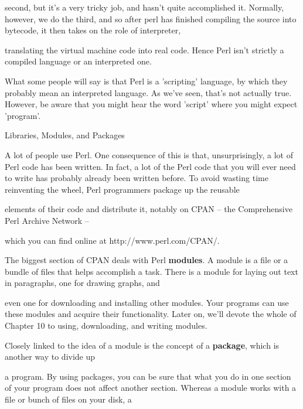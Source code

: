 \documentclass[a4paper,11pt]{book}
\begin{document}
\noindent second, but it's a very tricky job, and hasn't quite accomplished it. Normally, however, we do the third, and so after perl has finished compiling the source into bytecode, it then takes on the role of interpreter,

\noindent translating the virtual machine code into real code. Hence Perl isn't strictly a compiled language or an interpreted one.

\noindent 

\noindent What some people will say is that Perl is a 'scripting' language, by which they probably mean an interpreted language. As we've seen, that's not actually true. However, be aware that you might hear the word 'script' where you might expect 'program'.

\noindent 

\noindent Libraries, Modules, and Packages

\noindent 

\noindent A lot of people use Perl. One consequence of this is that, unsurprisingly, a lot of Perl code has been written. In fact, a lot of the Perl code that you will ever need to write has probably already been written before. To avoid wasting time reinventing the wheel, Perl programmers package up the reusable

\noindent elements of their code and distribute it, notably on CPAN -- the Comprehensive Perl Archive Network --

\noindent which you can find online at http://www.perl.com/CPAN/.

\noindent 

\noindent The biggest section of CPAN deals with Perl \textbf{modules}. A module is a file or a bundle of files that helps accomplish a task. There is a module for laying out text in paragraphs, one for drawing graphs, and

\noindent even one for downloading and installing other modules. Your programs can use these modules and acquire their functionality. Later on, we'll devote the whole of Chapter 10 to using, downloading, and writing modules.

\noindent 

\noindent 

\noindent Closely  linked to  the idea of a  module  is  the  concept  of  a  \textbf{package},  which  is  another  way to  divide  up

\noindent a  program.  By using packages,  you  can  be  sure  that  what  you  do  in  one section  of  your program  does not affect another section.  Whereas  a  module  works  with  a  file  or  bunch  of  files  on  your disk,  a
\end{document}
